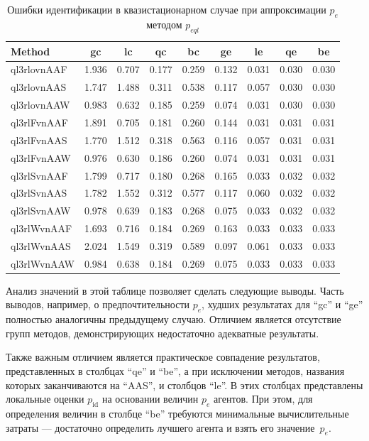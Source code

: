 \begin{table}[htb!]
  \caption{Ошибки идентификации в квазистационарном случае при аппроксимации $p_e$ методом $p_{eql}$}
  \label{atu:t:err_test_id_ql}
  \begin{center}
    \begin{tabular}{|l|c|c|c|c|c|c|c|c|}
    \hline
    Method      & gc    & lc    & qc    & bc    & ge     & le    & qe    & be    \\ \hline
    ql3rlovnAAF & 1.936 & 0.707 & 0.177 & 0.259 & 0.132  & 0.031 & 0.030 & 0.030 \\ \hline
    ql3rlovnAAS & 1.747 & 1.488 & 0.311 & 0.538 & 0.117  & 0.057 & 0.030 & 0.030 \\ \hline
    ql3rlovnAAW & 0.983 & 0.632 & 0.185 & 0.259 & 0.074  & 0.031 & 0.030 & 0.030 \\ \hline
    ql3rlFvnAAF & 1.891 & 0.705 & 0.181 & 0.260 & 0.144  & 0.031 & 0.031 & 0.031 \\ \hline
    ql3rlFvnAAS & 1.770 & 1.512 & 0.318 & 0.563 & 0.116  & 0.057 & 0.031 & 0.031 \\ \hline
    ql3rlFvnAAW & 0.976 & 0.630 & 0.186 & 0.260 & 0.074  & 0.031 & 0.031 & 0.031 \\ \hline
    ql3rlSvnAAF & 1.799 & 0.717 & 0.180 & 0.268 & 0.165  & 0.033 & 0.032 & 0.032 \\ \hline
    ql3rlSvnAAS & 1.782 & 1.552 & 0.312 & 0.577 & 0.117  & 0.060 & 0.032 & 0.032 \\ \hline
    ql3rlSvnAAW & 0.978 & 0.639 & 0.183 & 0.268 & 0.075  & 0.033 & 0.032 & 0.032 \\ \hline
    ql3rlWvnAAF & 1.693 & 0.716 & 0.184 & 0.269 & 0.163  & 0.033 & 0.033 & 0.033 \\ \hline
    ql3rlWvnAAS & 2.024 & 1.549 & 0.319 & 0.589 & 0.097  & 0.061 & 0.033 & 0.033 \\ \hline
    ql3rlWvnAAW & 0.984 & 0.638 & 0.184 & 0.269 & 0.075  & 0.033 & 0.033 & 0.033 \\ \hline
    \end{tabular}
  \end{center}
\end{table}


Анализ значений в этой таблице позволяет сделать следующие выводы.
Часть выводов, например, о предпочтительности $p_e$,
худших результатах для ``gc'' и ``ge'' полностью аналогичны
предыдущему случаю. Отличием является отсутствие групп
методов, демонстрирующих недостаточно адекватные результаты.

Также важным отличием является практическое совпадение
результатов, представленных в столбцах ``qe'' и ``be'',
а при исключении методов, названия которых заканчиваются на ``AAS'',
и столбцов ``le''. В этих столбцах представлены локальные оценки $p_\mathrm{id}$
на основании величин $p_e$ агентов. При этом,
для определения величин в столбце ``be'' требуются минимальные вычислительные
затраты --- достаточно определить лучшего агента и взять его значение~$p_e$.

